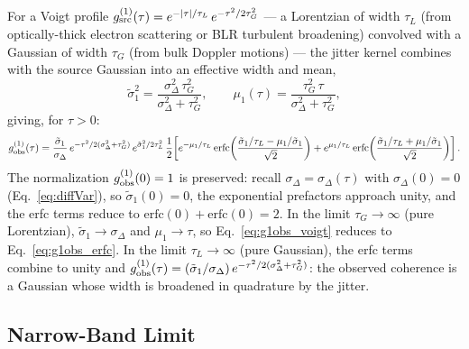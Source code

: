 \documentclass[aps,prd,onecolumn,amsmath,amssymb]{revtex4-2}
\begin{document}
For a Voigt profile $g^{(1)}_{\rm src}(\tau) = e^{-|\tau|/\tau_L}\,e^{-\tau^2/2\tau_G^2}$
--- a Lorentzian of width $\tau_L$ (from optically-thick electron scattering or
BLR turbulent broadening) convolved with a Gaussian of width $\tau_G$ (from
bulk Doppler motions) --- the jitter kernel combines with the source Gaussian
into an effective width and mean,
\begin{equation}
  \tilde\sigma_1^2 = \frac{\sigma_\Delta^2\,\tau_G^2}{\sigma_\Delta^2+\tau_G^2},
  \qquad
  \mu_1(\tau) = \frac{\tau_G^2\,\tau}{\sigma_\Delta^2+\tau_G^2},
  \label{eq:voigt_params}
\end{equation}
giving, for $\tau > 0$:
\begin{equation}
  g^{(1)}_{\rm obs}(\tau)
  = \frac{\tilde\sigma_1}{\sigma_\Delta}\,
    e^{-\tau^2/2(\sigma_\Delta^2+\tau_G^2)}\,
    e^{\tilde\sigma_1^2/2\tau_L^2}\,
    \frac{1}{2}\!\left[
      e^{-\mu_1/\tau_L}\,\mathrm{erfc}\!\left(\frac{\tilde\sigma_1/\tau_L - \mu_1/\tilde\sigma_1}{\sqrt{2}}\right)
      +e^{\mu_1/\tau_L}\,\mathrm{erfc}\!\left(\frac{\tilde\sigma_1/\tau_L + \mu_1/\tilde\sigma_1}{\sqrt{2}}\right)
    \right].
  \label{eq:g1obs_voigt}
\end{equation}
The normalization $g^{(1)}_{\rm obs}(0)=1$ is preserved: recall
$\sigma_\Delta = \sigma_\Delta(\tau)$ with $\sigma_\Delta(0)=0$
(Eq.~\eqref{eq:diffVar}), so $\tilde\sigma_1(0)=0$, the exponential prefactors
approach unity, and the erfc terms reduce to
$\mathrm{erfc}(0)+\mathrm{erfc}(0)=2$.
In the limit $\tau_G\to\infty$ (pure Lorentzian), $\tilde\sigma_1\to\sigma_\Delta$ and
$\mu_1\to\tau$, so Eq.~\eqref{eq:g1obs_voigt} reduces to Eq.~\eqref{eq:g1obs_erfc}.
In the limit $\tau_L\to\infty$ (pure Gaussian), the erfc terms combine to unity and
$g^{(1)}_{\rm obs}(\tau) = (\tilde\sigma_1/\sigma_\Delta)\,e^{-\tau^2/2(\sigma_\Delta^2+\tau_G^2)}$:
the observed coherence is a Gaussian whose width is broadened in quadrature by the jitter.

\subsection{Narrow-Band Limit}
\label{sec:narrowband}
\end{document}
